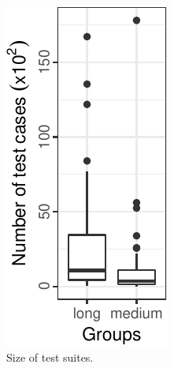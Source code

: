 \begin{figure}[t]
  \centering
  \begin{subfigure}{0.15\textwidth}
    \centering
    \includegraphics[width=.85\textwidth]{plots/boxplots-testcases.pdf}
    \caption{\label{fig:size-testsuites}Size of test suites.}
  \end{subfigure}
  ~
  \begin{subfigure}{0.3\textwidth}
    \centering

\end{subfigure}
\end{figure}
